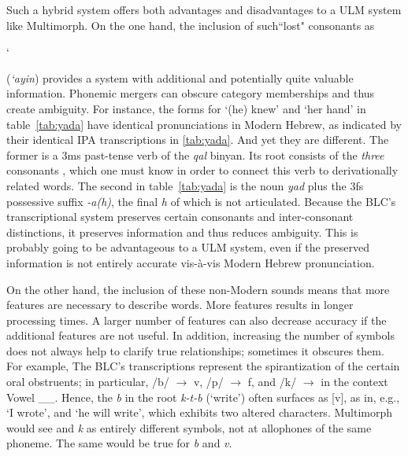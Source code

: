 Such a hybrid system offers both advantages and disadvantages to a 
\ac{ULM} system like Multimorph. 
On the one hand, the inclusion of such``lost" consonants as 
\begin{cjhebrew}`\end{cjhebrew} 
(\textit{`ayin}) provides a system with additional and potentially 
quite valuable information. 
Phonemic mergers can obscure category memberships and thus 
create ambiguity. For instance, 
the forms for `(he) knew' and `her hand' in  table~\ref{tab:yada}
have identical pronunciations in Modern Hebrew, as indicated 
by their identical \ac{IPA} transcriptions
in \ref{tab:yada}. And yet they are different. 
The former is a 3ms past-tense verb of the 
\emph{qal} binyan. Its root consists of the \emph{three}
consonants \textit{}, which one must 
know in order 
to connect this verb to derivationally related words. 
The second \textipa{[yad\`{a}]} 
in table~\ref{tab:yada} is the noun \textit{yad} plus 
the 3fs possessive suffix 
\textit{-a(h)}, the final \emph{h} of which is not articulated. 
Because the \ac{BLC}'s transcriptional system preserves 
certain consonants and 
inter-consonant distinctions, it preserves information and 
thus reduces ambiguity. 
This is probably going to be advantageous to a \ac{ULM} 
system, even if the preserved 
information is not entirely accurate vis-\`{a}-vis Modern Hebrew 
pronunciation.

On the other hand, the inclusion of these non-Modern 
sounds means that more features are necessary to describe 
words. More features results in longer processing times. 
A larger number of features can also decrease accuracy 
if the additional features are not useful. 
In addition, increasing the number of symbols does not 
always help to clarify true relationships; sometimes it 
obscures them. For example, The BLC's transcriptions 
represent the spirantization of the certain oral obstruents; 
in particular, /b/ $\to$ v, /p/ $\to$ f, and /k/ $\to$  
in the context
Vowel \_\_. Hence, the \textit{b} in the root \textit{k-t-b} 
(`write') often surfaces as [v], as in, e.g.,  
`I wrote', and 
 `he will write', which exhibits 
two altered characters. Multimorph would see \textit{} 
and \textit{k} as 
entirely different symbols, not at allophones
of the same phoneme. The same would be true for \textit{b} 
and \textit{v}.  



